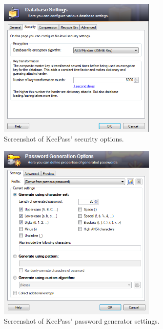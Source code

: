 			\begin{figure}[h!]
				\centering
				\includegraphics[width=0.7\textwidth]{figures/analysis/keepass_create_security.png}
				\caption{Screenshot of KeePass' security options.}
				\label{fig:keepass_create_security}
			\end{figure}
		

			\begin{figure}[h!]
				\centering
				\includegraphics[width=0.7\textwidth]{figures/analysis/keepass_newpassword_passwordgen.png}
				\caption{Screenshot of KeePass' password generator settings.}
				\label{fig:keepass_newpassword_passwordgen}
			\end{figure}







